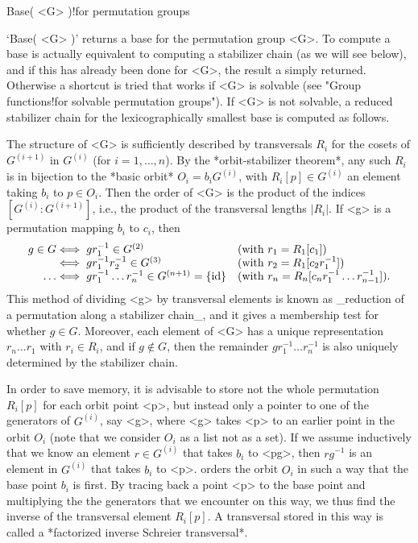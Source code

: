 \>Base( <G> )!{for permutation groups}

`Base( <G> )' returns a base for the permutation  group <G>. To compute a
base is  actually equivalent to computing a  stabilizer chain (as we will
see below), and if this   has already been   done for <G>, the result   a
simply  returned. Otherwise  a  shortcut is tried  that works   if <G> is
solvable (see "Group  functions!for solvable permutation groups"). If <G>
is  not  solvable, a  reduced stabilizer  chain for the lexicographically
smallest base is computed as follows.

\danger The structure  of  <G> is sufficiently described  by transversals
$R_i$ for the cosets of $G^{(i+1)}$ in $G^{(i)}$ (for $i=1,\ldots,n$). By
the  *orbit-stabilizer theorem*,  any such $R_i$  is  in bijection to the
*basic orbit*  $O_i =  b_iG^{(i)}$, with  $R_i[p]\in G^{(i)}$  an element
taking $b_i$ to $p\in O_i$. Then the order  of <G> is  the product of the
indices  $[G^{(i)}:G^{(i+1)}]$,  i.e.,  the product   of the  transversal
lengths $|R_i|$. If <g> is a permutation mapping $b_i$ to $c_i$, then
$$
  \vbox{\halign{\hfil$#$& $\iff #$\hfil & \quad #\hfil \cr
  g\in G & gr_1^{-1}\in G^{(2)} & (with $r_1=R_1[c_1]$) \cr
         & gr_1^{-1}r_2^{-1}\in G^{(3)} &
                                  (with $r_2=R_1[c_2r_1^{-1}]$) \cr
  \ldots & gr_1^{-1}\ldots r_n^{-1}\in G^{(n+1)}=\{{\rm id}\} &
           (with $r_n=R_n[c_nr_1^{-1}\ldots r_{n-1}^{-1}]$).\cr}}$$
This   method  of  dividing  <g> by  transversal  elements   is known  as
_reduction of a permutation   along a stabilizer  chain_, and it gives a membership test for
whether  $g\in G$.   Moreover,  each  element    of  <G> has   a   unique
representation  $r_n\ldots  r_1$ with  $r_i\in  R_i$, and if $g\notin G$,
then the remainder $gr_1^{-1}\ldots r_n^{-1}$ is also uniquely determined
by the stabilizer chain.

In  order  to save   memory,  it is  advisable   to store  not the  whole
permutation $R_i[p]$ for each orbit point <p>, but instead only a pointer
to one of the generators of $G^{(i)}$, say <g>, where <g> takes <p> to an
earlier point in  the orbit $O_i$ (note that  we consider $O_i$ as a list
not as  a set). If we assume  inductively that we know  an element $r \in
G^{(i)}$ that  takes $b_i$  to  <pg>,  then  $rg^{-1}$  is an element  in
$G^{(i)}$ that takes $b_i$ to <p>. {\GAP} orders the  orbit $O_i$ in such
a way that the base point $b_i$ is first. By  tracing back a point <p> to
the base  point and multiplying the  the generators  that we encounter on
this way, we thus find the inverse of the transversal element $R_i[p]$. A
transversal stored in this  way is called  a *factorized inverse Schreier
transversal*.

